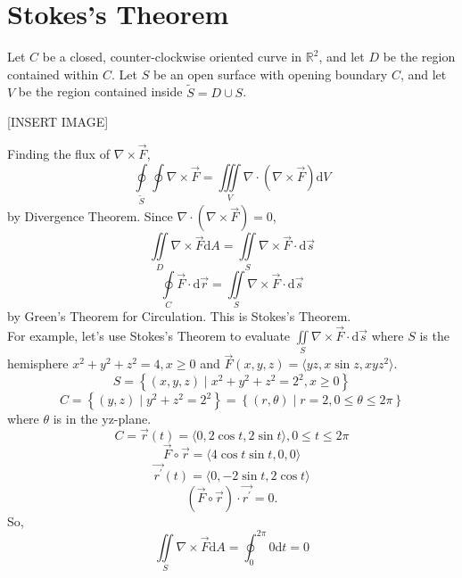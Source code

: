 \section{Stokes's Theorem}
\noindent
Let $C$ be a closed, counter-clockwise oriented curve in $\mathbb{R}^2$, and let $D$ be the region contained within $C$. Let $S$ be an open surface with opening boundary $C$, and let $V$ be the region contained inside $\tilde{S} = D \cup S$.

[INSERT IMAGE]

\noindent
Finding the flux of $\nabla \times \vec{F}$,
\begin{equation*}
	\oint\limits_{\tilde{S}}\oint{\nabla \times \vec{F}} = \iiint\limits_{V}{\nabla \cdot (\nabla \times \vec{F})\mathrm{d}V}
\end{equation*}
by Divergence Theorem. Since $\nabla \cdot (\nabla \times \vec{F}) = 0$, 
\begin{equation*}
	\iint\limits_{D}{\nabla \times \vec{F}\mathrm{d}A} = \iint\limits_{S}{\nabla \times \vec{F} \cdot \mathrm{d}\vec{s}}
\end{equation*}
\begin{equation*}
	\oint\limits_{C}{\vec{F} \cdot \mathrm{d}\vec{r}} = \iint\limits_{S}{\nabla \times \vec{F} \cdot \mathrm{d}\vec{s}}
\end{equation*}
by Green's Theorem for Circulation. This is Stokes's Theorem.\\

\noindent
For example, let's use Stokes's Theorem to evaluate $\iint\limits_{S}{\nabla \times \vec{F} \cdot \mathrm{d}\vec{s}}$ where $S$ is the hemisphere $x^2 + y^2 + z^2 = 4, x \geq 0$ and $\vec{F}(x,y,z) = \langle yz, x\sin{z}, xyz^2 \rangle$.
\begin{equation*}
	S = \left\{(x,y,z) \mid x^2 + y^2 + z^2 = 2^2, x \geq 0 \right\}
\end{equation*}
\begin{equation*}
	C = \left\{(y,z) \mid y^2 + z^2 = 2^2 \right\} = \left\{(r,\theta) \mid r = 2, 0 \leq \theta \leq 2\pi \right\}
\end{equation*}
where $\theta$ is in the yz-plane.
\begin{equation*}
	C = \vec{r}(t) = \langle 0, 2\cos{t}, 2\sin{t} \rangle, 0 \leq t \leq 2\pi
\end{equation*}
\begin{equation*}
	\vec{F}\circ\vec{r} = \langle 4\cos{t}\sin{t}, 0, 0 \rangle
\end{equation*}
\begin{equation*}
	\vec{r^\prime}(t) = \langle 0, -2\sin{t}, 2\cos{t}\rangle
\end{equation*}
\begin{equation*}
	\left(\vec{F}\circ\vec{r}\right) \cdot \vec{r^\prime} = 0.
\end{equation*}
So, 
\begin{equation*}
	\iint\limits_{S}{\nabla \times \vec{F}\mathrm{d}A} = \oint_{0}^{2\pi}{0\mathrm{d}t} = 0
\end{equation*}

